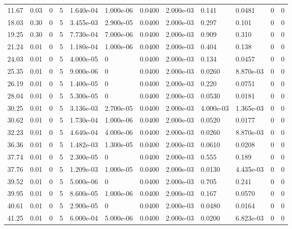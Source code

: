 \documentclass[preview]{standalone}
\begin{document}
{{\begin{tabular}{L{1.2cm}C{1.2cm} C{0.3cm}C{0.5cm} C{1.4cm}C{1.4cm} C{1.4cm}C{1.4cm} C{1.6cm}C{1.6cm} C{1.6cm}C{1.6cm}}
  11.67  &  0.03  & 0     &  5 &  1.640e-04  & 1.000e-06  &  0.0400&   2.000e-03& 0.141 & 0.0481   &  0 & 0  \\ 
  18.03  &  0.30  & 0     &  5 &  3.455e-03  & 2.900e-05  &  0.0400&   2.000e-03& 0.297 & 0.101   &  0 & 0  \\ 
  19.25  &  0.30  & 0     &  5 &  7.730e-04  & 7.000e-06  &  0.0400&   2.000e-03& 0.909 & 0.310   &  0 & 0  \\ 
  21.24  &  0.01  & 0     &  5 &  1.180e-04  & 1.000e-06  &  0.0400&   2.000e-03& 0.404 & 0.138   &  0 & 0  \\ 
  24.03  &  0.01  & 0     &  5 &  4.000e-05  & 0  &  0.0400&   2.000e-03& 0.134 & 0.0457   &  0 & 0  \\ 
  25.35  &  0.01  & 0     &  5 &  9.000e-06  & 0  &  0.0400&   2.000e-03& 0.0260 & 8.870e-03   &  0 & 0  \\ 
  26.19  &  0.01  & 0     &  5 &  1.400e-05  & 0  &  0.0400&   2.000e-03& 0.220 & 0.0751   &  0 & 0  \\ 
  28.04  &  0.01  & 0     &  5 &  5.300e-05  & 0  &  0.0400&   2.000e-03& 0.0530 & 0.0181   &  0 & 0  \\ 
  30.25  &  0.01  & 0     &  5 &  3.136e-03  & 2.700e-05  &  0.0400&   2.000e-03& 4.000e-03 & 1.365e-03   &  0 & 0  \\ 
  30.62  &  0.01  & 0     &  5 &  1.730e-04  & 1.000e-06  &  0.0400&   2.000e-03& 0.0520 & 0.0177   &  0 & 0  \\ 
  32.23  &  0.01  & 0     &  5 &  4.640e-04  & 4.000e-06  &  0.0400&   2.000e-03& 0.0260 & 8.870e-03   &  0 & 0  \\ 
  36.36  &  0.01  & 0     &  5 &  1.482e-03  & 1.300e-05  &  0.0400&   2.000e-03& 0.0610 & 0.0208   &  0 & 0  \\ 
  37.74  &  0.01  & 0     &  5 &  2.300e-05  & 0  &  0.0400&   2.000e-03& 0.555 & 0.189   &  0 & 0  \\ 
  37.76  &  0.01  & 0     &  5 &  1.209e-03  & 1.000e-05  &  0.0400&   2.000e-03& 0.0130 & 4.435e-03   &  0 & 0  \\ 
  39.52  &  0.01  & 0     &  5 &  5.000e-06  & 0  &  0.0400&   2.000e-03& 0.705 & 0.241   &  0 & 0  \\ 
  39.95  &  0.01  & 0     &  5 &  8.600e-05  & 1.000e-06  &  0.0400&   2.000e-03& 0.167 & 0.0570   &  0 & 0  \\ 
  40.61  &  0.01  & 0     &  5 &  2.900e-05  & 0  &  0.0400&   2.000e-03& 0.0480 & 0.0164   &  0 & 0  \\ 
  41.25  &  0.01  & 0     &  5 &  6.000e-04  & 5.000e-06  &  0.0400&   2.000e-03& 0.0200 & 6.823e-03   &  0 & 0  \\ 

\end{tabular}}}
\end{document}
